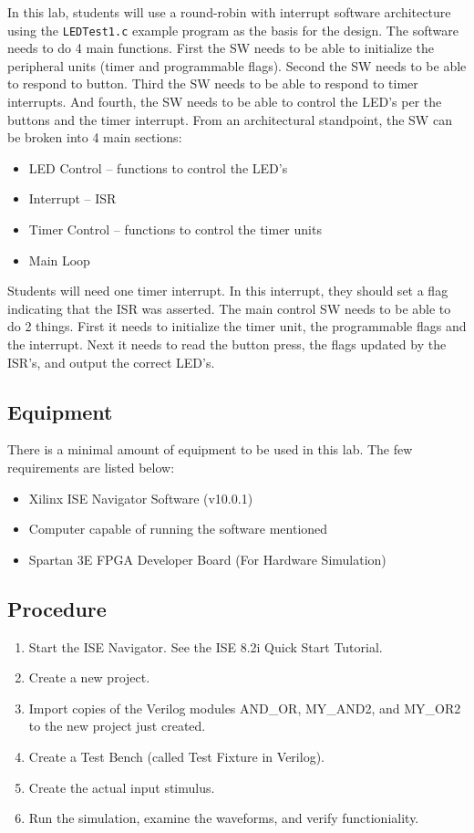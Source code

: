 \documentclass[aps,letterpaper,10pt]{revtex4}
\begin{document}
In this lab, students will use a round-robin with interrupt software architecture using the \texttt{LEDTest1.c} example program as the basis for the design.  The software needs to do 4 main functions.  First the SW needs to be able to initialize the peripheral units (timer and programmable flags).  Second the SW needs to be able to respond to button.  Third the SW needs to be able to respond to timer interrupts.  And fourth, the SW needs to be able to control the LED’s per the buttons and the timer interrupt.
From an architectural standpoint, the SW can be broken into 4 main sections:
\begin{itemize}
	\item LED Control -- functions to control the LED's
	\item Interrupt -- ISR
	\item Timer Control -- functions to control the timer units
	\item Main Loop
\end{itemize}
\vspace{3mm}

Students will need one timer interrupt.  In this interrupt, they should set a flag indicating that the ISR was asserted.
The main control SW needs to be able to do 2 things.  First it needs to initialize the timer unit, the programmable flags and the interrupt.  Next it needs to read the button press, the flags updated by the ISR’s, and output the correct LED’s.

\subsection{Equipment}
There is a minimal amount of equipment to be used in this lab.  The few requirements are listed below:
	\begin{itemize}
		\item Xilinx ISE Navigator Software (v10.0.1)
		\item Computer capable of running the software mentioned
		\item Spartan 3E FPGA Developer Board (For Hardware Simulation)
	\end{itemize}

\subsection{Procedure}

	\begin{enumerate}
		\item Start the ISE Navigator. See the ISE 8.2i Quick Start Tutorial.
		\item Create a new project.
		\item Import copies of the Verilog modules AND\_OR, MY\_AND2, and MY\_OR2 to the new project just created.
		\item Create a Test Bench (called Test Fixture in Verilog).
		\item Create the actual input stimulus.
		\item Run the simulation, examine the waveforms, and verify functioniality.
	\end{enumerate}
\end{document}
